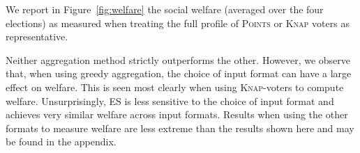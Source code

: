 \documentclass[runningheads]{llncs}
\newcommand{\points}{\textsc{Points}}
\newcommand{\knap}{\textsc{Knap}}
\newcommand{\mes}{ES}
\begin{document}
We report in Figure~\ref{fig:welfare} the   social welfare (averaged over the four elections) as measured when treating the full profile of \points{} or \knap{} voters as representative.  %


Neither aggregation method strictly outperforms the other. However, we observe that, when using greedy aggregation, the choice of input format can have a large effect on welfare. This is seen most clearly when using \knap-voters to compute welfare. Unsurprisingly, \mes{} is less sensitive to  the choice of input format and   achieves very similar welfare across input formats.
Results when using the other formats to measure welfare are less extreme than the results shown here and may be found in the appendix.






\end{document}
